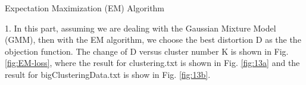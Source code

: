 \begin{description}
\begin{description}
\end{description}

\newpage
\item[(\Romannum{5}).] Expectation Maximization (EM) Algorithm

\begin{description}
\item{1.} In this part, assuming we are dealing with the Gaussian Mixture Model (GMM), then with the EM algorithm, we choose the best distortion D as the the objection function. The change of D versus cluster number K is shown in Fig. \ref{fig:EM-loss}, where the result for clustering.txt is shown in Fig. \ref{fig:13a} and the result for bigClusteringData.txt is show in Fig. \ref{fig:13b}.


\end{description}
\end{description}

